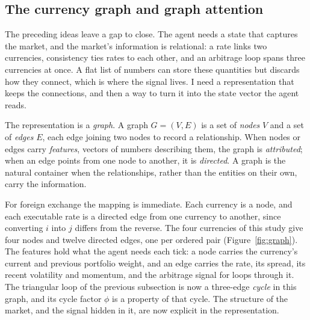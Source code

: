 \documentclass[12pt,a4paper]{article}
\begin{document}
\subsection{The currency graph and graph attention}
\label{sub:graph}

The preceding ideas leave a gap to close. The agent needs a state that captures the market, and
the market's information is relational: a rate links two currencies, consistency ties rates to
each other, and an arbitrage loop spans three currencies at once. A flat list of numbers can
store these quantities but discards how they connect, which is where the signal lives. I need a
representation that keeps the connections, and then a way to turn it into the state vector the
agent reads.

The representation is a \emph{graph}. A graph $G=(V,E)$ is a set of \emph{nodes} $V$ and a set of
\emph{edges} $E$, each edge joining two nodes to record a relationship. When nodes or edges carry
\emph{features}, vectors of numbers describing them, the graph is \emph{attributed}; when an edge
points from one node to another, it is \emph{directed}. A graph is the natural container when the
relationships, rather than the entities on their own, carry the information.

For foreign exchange the mapping is immediate. Each currency is a node, and each executable rate
is a directed edge from one currency to another, since converting $i$ into $j$ differs from the
reverse. The four currencies of this study give four nodes and twelve directed edges, one per
ordered pair (Figure~\ref{fig:graph}). The features hold what the agent needs each tick: a node
carries the currency's current and previous portfolio weight, and an edge carries the rate, its
spread, its recent volatility and momentum, and the arbitrage signal for loops through it. The
triangular loop of the previous subsection is now a three-edge \emph{cycle} in this graph, and
its cycle factor $\phi$ is a property of that cycle. The structure of the market, and the signal
hidden in it, are now explicit in the representation.
\end{document}
